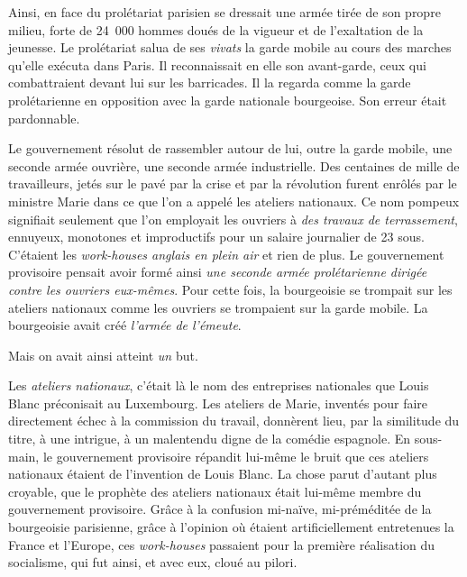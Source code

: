 \documentclass[french,twoside]{book} %
\begin{document}
Ainsi, en face du prolétariat parisien se dressait une armée tirée de son propre milieu, forte de 24 000 hommes doués de la vigueur et de l’exaltation de la jeunesse. Le prolétariat salua de ses \emph{vivats} la garde mobile au cours des marches qu’elle exécuta dans Paris. Il reconnaissait en elle son avant-garde, ceux qui combattraient devant lui sur les barricades. Il la regarda comme la garde prolétarienne en opposition avec la garde nationale bourgeoise. Son erreur était pardonnable.\par
Le gouvernement résolut de rassembler autour de lui, outre la garde mobile, une seconde armée ouvrière, une seconde armée industrielle. Des centaines de mille de travailleurs, jetés sur le pavé par la crise et par la révolution furent enrôlés par le ministre Marie dans ce que l’on a appelé les ateliers nationaux. Ce nom pompeux signifiait seulement que l’on employait les ouvriers à \emph{des travaux de terrassement}, ennuyeux, monotones et improductifs pour un salaire journalier de 23 sous. C’étaient les \emph{work-houses anglais en plein air} et rien de plus. Le gouvernement provisoire pensait avoir formé ainsi \emph{une seconde armée prolétarienne dirigée contre les ouvriers eux-mêmes}. Pour cette fois, la bourgeoisie se trompait sur les ateliers nationaux comme les ouvriers se trompaient sur la garde mobile. La bourgeoisie avait créé \emph{l’armée de l’émeute}.\par
Mais on avait ainsi atteint \emph{un} but.\par
Les \emph{ateliers nationaux}, c’était là le nom des entreprises nationales que Louis Blanc préconisait au Luxembourg. Les ateliers de Marie, inventés pour faire directement échec à la commission du travail, donnèrent lieu, par la similitude du titre, à une intrigue, à un malentendu digne de la comédie espagnole. En sous-main, le gouvernement provisoire répandit lui-même le bruit que ces ateliers nationaux étaient de l’invention de Louis Blanc. La chose parut d’autant plus croyable, que le prophète des ateliers nationaux était lui-même membre du gouvernement provisoire. Grâce à la confusion mi-naïve, mi-préméditée de la bourgeoisie parisienne, grâce à l’opinion où étaient artificiellement entretenues la France et l’Europe, ces \emph{work-houses} passaient pour la première réalisation du socialisme, qui fut ainsi, et avec eux, cloué au pilori.\par
\end{document}
